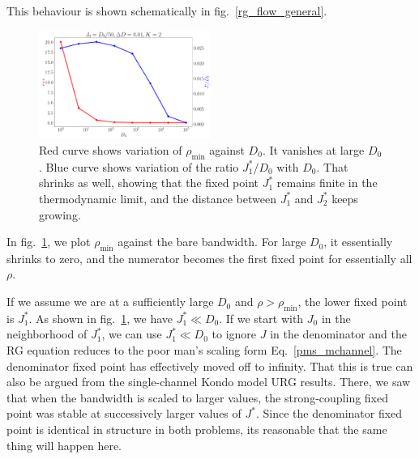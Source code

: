 \documentclass{revtex4-2}
\begin{document}
This behaviour is shown schematically in fig.~\ref{rg_flow_general}. 
\begin{figure}[!htb]
	\centering
	\includegraphics[width=0.5\textwidth]{./rhomin_D.pdf}
	\caption{Red curve shows variation of \(\rho_\text{min}\) against \(D_0\). It vanishes at large \(D_0\). Blue curve shows variation of the ratio \(J_1^* / D_0\) with \(D_0\). That shrinks as well, showing that the fixed point \(J_1^*\) remains finite in the thermodynamic limit, and the distance between \(J_1^*\) and \(J_2^*\) keeps growing.}
	\label{rhomin_vs_D}
\end{figure}
In fig.~\ref{rhomin_vs_D}, we plot \(\rho_\text{min}\) against the bare bandwidth. For large \(D_0\), it essentially shrinks to zero, and the numerator becomes the first fixed point for essentially all \(\rho\).

If we assume we are at a sufficiently large \(D_0\) and \(\rho > \rho_\text{min}\), the lower fixed point is \(J_1^*\). As shown in fig.~\ref{rhomin_vs_D}, we have \(J_1^* \ll D_0\). If we start with \(J_0\) in the neighborhood of \(J_1^*\), we can use \(J_1^* \ll D_0\) to ignore \(J\) in the denominator and the RG equation reduces to the poor man's scaling form Eq.~\ref{pms_mchannel}. The denominator fixed point has effectively moved off to infinity. That this is true can also be argued from the single-channel Kondo model URG results. There, we saw that when the bandwidth is scaled to larger values, the strong-coupling fixed point was stable at successively larger values of \(J^*\). Since the denominator fixed point is identical in structure in both problems, its reasonable that the same thing will happen here.
\end{document}
